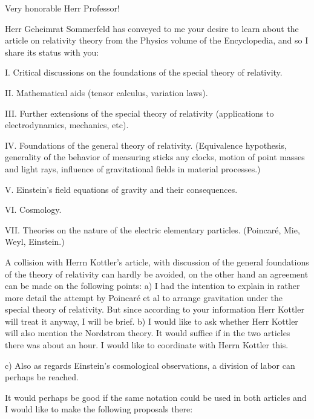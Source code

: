 \begin{letter}{5}
\begin{header}
\date{1920/05/07}

\makeheader

\end{header}

Very honorable Herr Professor!

Herr Geheimrat Sommerfeld has conveyed to me your desire to learn about the article on relativity theory from the Physics volume of the Encyclopedia, and so I share its status with you:

I. Critical discussions on the foundations of the special theory of relativity.

II. Mathematical aids (tensor calculus, variation laws).

III. Further extensions of the special theory of relativity (applications to electrodynamics, mechanics, etc).

IV. Foundations of the general theory of relativity. (Equivalence hypothesis, generality of the behavior of measuring sticks any clocks, motion of point masses and light rays, influence of gravitational fields in material processes.)

V. Einstein's field equations of gravity and their consequences.

VI. Cosmology.

VII. Theories on the nature of the electric elementary particles. (Poincaré, Mie, Weyl, Einstein.)

A collision with Herrn Kottler's article, with discussion of the general foundations of the theory of relativity can hardly be avoided, on the other hand an agreement can be made on the following points: a) I had the intention to explain in rather more detail the attempt by Poincaré et al to arrange gravitation under the special theory of relativity. But since according to your information Herr Kottler will treat it anyway, I will be brief. b) I would like to ask whether Herr Kottler will also mention the Nordstrom theory. It would suffice if in the two articles there was about an hour. I would like to coordinate with Herrn Kottler this.

c) Also as regards Einstein's cosmological observations, a division of labor can perhaps be reached.

It would perhaps be good if the same notation could be used in both articles and I would like to make the following proposals there:


\end{letter}
